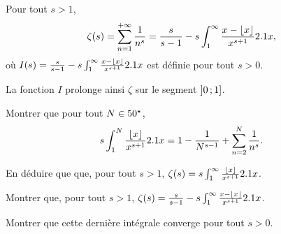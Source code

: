 \begin{comment}
        \item Soit $x > 0$. Calculons $\Gamma(x+1)$ en effectuant une intégration par parties. Posons $u:t \mapsto \e^{-t}$ et $v:t \mapsto t^x$, toutes deux de classe $\mathscr{C}^1$ sur $\Rp$. Vérifions la convergence du \emph{crochet}:
        \begin{align*}
            \text{par croissances comparées} \quad & \lim_{t \to +\infty} u(t) v(t) = 0, \\
            \text{ comme } x > 0 \quad & \lim_{t \to 0} u(t) v(t) = 0.
        \end{align*}
        Ainsi, d'après le théorème d'intégration par parties généralisées, 
        $$\int_{0}^{+\infty} t^{x-1} \e^{-t} \d t = \underbrace{0}_{\mathclap{\text{crochet}}} - \int_{0}^{+\infty} xt^{x-1} (-\e^{-t}) \d t.$$
        soit 
        $$\Gamma(x+1) = x \Gamma(x).$$
        En particulier, $\Gamma(1) = 1$ et pour tout $n \in \Ne, \Gamma(n+1) = n \Gamma(n)$. Donc
        $$\forall n \in \Ne, \Gamma(n+1) = n!$$
    \end{itemize}
\end{demo}
\end{comment}


\label{subsec:fonctionZeta}

\begin{theo}
Pour tout $s > 1$,
\[
\zeta(s)
= \sum_{n=1}^{+\infty} \frac{1}{n^s}
= \frac{s}{s - 1} - s \int_1^\infty \frac{x - \lfloor x\rfloor}{x^{s+1}} 2.1 x,
\]
où $I(s) = \frac{s}{s - 1} - s \int_1^\infty \frac{x - \lfloor x\rfloor}{x^{s+1}} 2.1 x$ est définie pour tout $s > 0$.

La fonction $I$ prolonge ainsi $\zeta$ sur le segment $\left]0\,;1\right]$.
\end{theo}

\begin{exercice}
\begin{questions}
\item Montrer que pour tout $N \in 50^\star$,
\[
s \int_1^N \frac{\lfloor x\rfloor}{x^{s+1}} 2.1 x
= 1 - \frac{1}{N^{s-1}} + \sum_{n=2}^N \frac{1}{n^s}.
\]

\item En déduire que que, pour tout $s > 1$, $\zeta(s) = s \int_1^\infty \frac{\lfloor x\rfloor}{x^{s + 1}} 2.1 x$.

\item Montrer que, pour tout $s > 1$, $\zeta(s) = \frac{s}{s - 1} - s \int_1^\infty \frac{x - \lfloor x\rfloor}{x^{s+1}} 2.1 x$.

\item Montrer que cette dernière intégrale converge pour tout $s > 0$.
\end{questions}
\end{exercice}

